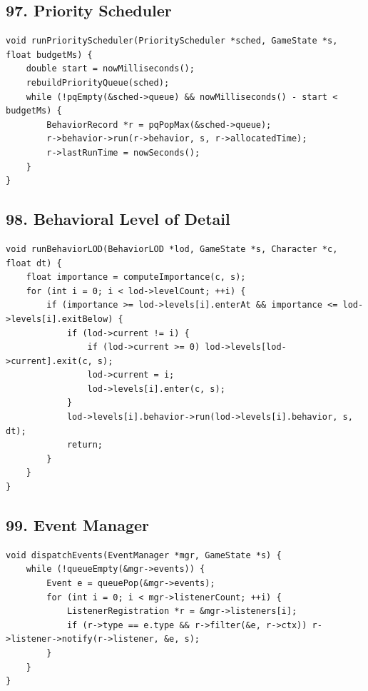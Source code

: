 \documentclass[10pt,letterpaper]{article}
\begin{document}
\subsection*{97. Priority Scheduler}
{}

\begin{verbatim}
void runPriorityScheduler(PriorityScheduler *sched, GameState *s, float budgetMs) {
    double start = nowMilliseconds();
    rebuildPriorityQueue(sched);
    while (!pqEmpty(&sched->queue) && nowMilliseconds() - start < budgetMs) {
        BehaviorRecord *r = pqPopMax(&sched->queue);
        r->behavior->run(r->behavior, s, r->allocatedTime);
        r->lastRunTime = nowSeconds();
    }
}
\end{verbatim}

\subsection*{98. Behavioral Level of Detail}
{}

\begin{verbatim}
void runBehaviorLOD(BehaviorLOD *lod, GameState *s, Character *c, float dt) {
    float importance = computeImportance(c, s);
    for (int i = 0; i < lod->levelCount; ++i) {
        if (importance >= lod->levels[i].enterAt && importance <= lod->levels[i].exitBelow) {
            if (lod->current != i) {
                if (lod->current >= 0) lod->levels[lod->current].exit(c, s);
                lod->current = i;
                lod->levels[i].enter(c, s);
            }
            lod->levels[i].behavior->run(lod->levels[i].behavior, s, dt);
            return;
        }
    }
}
\end{verbatim}

\subsection*{99. Event Manager}
{}

\begin{verbatim}
void dispatchEvents(EventManager *mgr, GameState *s) {
    while (!queueEmpty(&mgr->events)) {
        Event e = queuePop(&mgr->events);
        for (int i = 0; i < mgr->listenerCount; ++i) {
            ListenerRegistration *r = &mgr->listeners[i];
            if (r->type == e.type && r->filter(&e, r->ctx)) r->listener->notify(r->listener, &e, s);
        }
    }
}
\end{verbatim}
\end{document}
